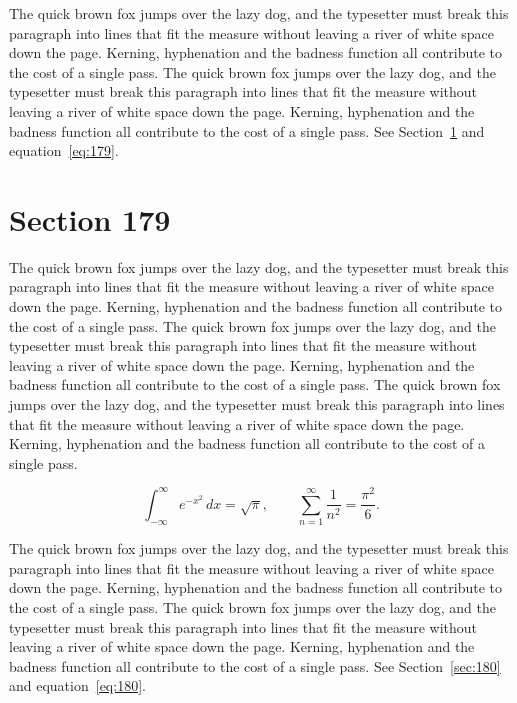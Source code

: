 \documentclass{article}
\begin{document}
The quick brown fox jumps over the lazy dog, and the typesetter must break this paragraph into lines that fit the measure without leaving a river of white space down the page. Kerning, hyphenation and the badness function all contribute to the cost of a single pass. The quick brown fox jumps over the lazy dog, and the typesetter must break this paragraph into lines that fit the measure without leaving a river of white space down the page. Kerning, hyphenation and the badness function all contribute to the cost of a single pass. 
See Section~\ref{sec:179} and equation~\eqref{eq:179}.
\section{Section 179}
\label{sec:179}
The quick brown fox jumps over the lazy dog, and the typesetter must break this paragraph into lines that fit the measure without leaving a river of white space down the page. Kerning, hyphenation and the badness function all contribute to the cost of a single pass. The quick brown fox jumps over the lazy dog, and the typesetter must break this paragraph into lines that fit the measure without leaving a river of white space down the page. Kerning, hyphenation and the badness function all contribute to the cost of a single pass. The quick brown fox jumps over the lazy dog, and the typesetter must break this paragraph into lines that fit the measure without leaving a river of white space down the page. Kerning, hyphenation and the badness function all contribute to the cost of a single pass. 

\begin{equation}\label{eq:179}
\int_{-\infty}^{\infty} e^{-x^{2}}\,dx = \sqrt{\pi}, \qquad
\sum_{n=1}^{\infty} \frac{1}{n^{2}} = \frac{\pi^{2}}{6}.
\end{equation}

The quick brown fox jumps over the lazy dog, and the typesetter must break this paragraph into lines that fit the measure without leaving a river of white space down the page. Kerning, hyphenation and the badness function all contribute to the cost of a single pass. The quick brown fox jumps over the lazy dog, and the typesetter must break this paragraph into lines that fit the measure without leaving a river of white space down the page. Kerning, hyphenation and the badness function all contribute to the cost of a single pass. 
See Section~\ref{sec:180} and equation~\eqref{eq:180}.
\end{document}
